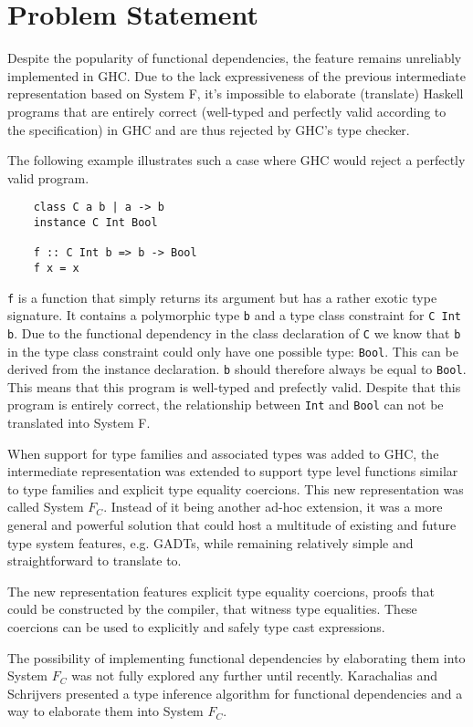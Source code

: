\section{Problem Statement}
Despite the popularity of functional dependencies, the feature remains unreliably
implemented in GHC. Due to the lack expressiveness of the previous intermediate
representation based on System F, it's impossible to elaborate (translate)
Haskell programs that are entirely correct (well-typed and perfectly valid
according to the specification) in GHC and are thus rejected by GHC's type checker.

The following example illustrates such a case where GHC would reject a perfectly
valid program.
\begin{verbatim}
    class C a b | a -> b
    instance C Int Bool

    f :: C Int b => b -> Bool
    f x = x
\end{verbatim}

\texttt{f} is a function that simply returns its argument but has a rather
exotic type signature. It contains a polymorphic type \texttt{b} and a type
class constraint for \texttt{C Int b}. Due to the functional dependency in the
class declaration of \texttt{C} we know that \texttt{b} in the type class
constraint could only have one possible type: \texttt{Bool}. This can be
derived from the instance declaration. \texttt{b} should therefore always be
equal to \texttt{Bool}. This means that this program is well-typed and prefectly
valid. Despite that this program is entirely correct, the relationship between
\texttt{Int} and \texttt{Bool} can not be translated into System F.

When support for type families and associated types was added to GHC, the
intermediate representation was extended to support type level functions similar
to type families and explicit type equality coercions. This new representation
was called System $F_C$. Instead of it being another ad-hoc extension, it was a
more general and powerful solution that could host a multitude of existing and
future type system features, e.g. GADTs, while remaining relatively simple
and straightforward to translate to.

The new representation features explicit type equality coercions, proofs that
could be constructed by the compiler, that witness type equalities. These
coercions can be used to explicitly and safely type cast expressions.

The possibility of implementing functional dependencies by elaborating them into
System $F_C$ was not fully explored any further until recently. Karachalias and
Schrijvers\cite{Karachalias:2017:EFD:3156695.3122966} presented a type
inference algorithm for functional dependencies and a way to elaborate them into
System $F_C$.

